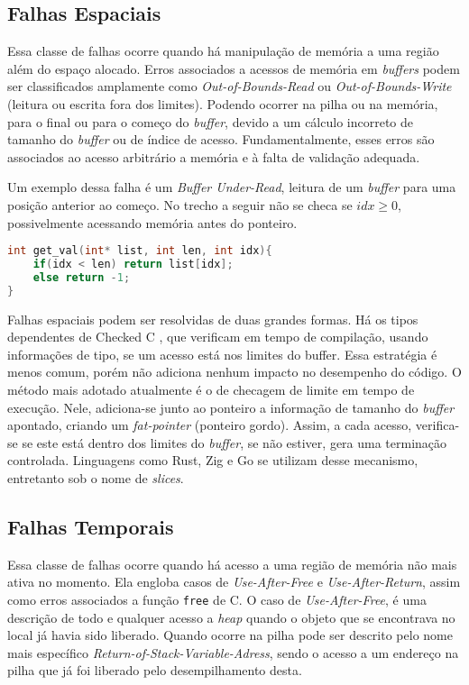 \subsection{Falhas Espaciais}
\label{sec:mem-error:spacial}

Essa classe de falhas ocorre quando há manipulação de memória a uma região além do espaço alocado. Erros associados a acessos de memória em \emph{buffers} podem ser classificados amplamente como \emph{Out-of-Bounds-Read} ou \emph{Out-of-Bounds-Write} (leitura ou escrita fora dos limites). Podendo ocorrer na pilha ou na memória, para o final ou para o começo do \emph{buffer}, devido a um cálculo incorreto de tamanho do \emph{buffer} ou de índice de acesso.  Fundamentalmente, esses erros são associados ao acesso arbitrário a memória e à falta de validação adequada.

Um exemplo dessa falha é um \emph{Buffer Under-Read}, 
leitura de um \emph{buffer} para uma posição anterior ao começo. No trecho a seguir
não se checa se $idx \ge 0$, possivelmente acessando memória antes do ponteiro.

\begin{lstlisting}[language=C ,label={lst:spacial-error-c}, caption=Exemplo de uma Falha Espacial]
int get_val(int* list, int len, int idx){
	if(idx < len) return list[idx];
 	else return -1;
}
\end{lstlisting}

Falhas espaciais podem ser resolvidas de duas grandes formas. Há os tipos dependentes de Checked C \cite{CHECKEDC}, que verificam em tempo de compilação, usando informações de tipo, se um acesso está nos limites do buffer. Essa estratégia é menos comum, porém não adiciona nenhum impacto no desempenho do código. 
O método mais adotado atualmente é o de checagem de limite em tempo de execução. Nele, adiciona-se junto ao ponteiro a informação de tamanho do \emph{buffer} apontado, criando um \emph{fat-pointer} (ponteiro gordo). Assim, a cada acesso, verifica-se se este está dentro dos limites do \emph{buffer}, se não estiver, gera uma terminação controlada. Linguagens como Rust, Zig e Go se utilizam desse mecanismo, entretanto sob o nome de \emph{slices}.


\subsection{Falhas Temporais}
\label{sec:mem-error:temporal}

Essa classe de falhas ocorre quando há acesso a uma região de memória não mais ativa no momento. Ela engloba casos de \emph{Use-After-Free} e \emph{Use-After-Return}, assim como erros associados a função \lstinline[language=C]|free| de C. O caso de \emph{Use-After-Free}, é uma descrição de todo e qualquer acesso a \emph{heap} quando o objeto que se encontrava no local já havia sido liberado. Quando ocorre na pilha pode ser descrito pelo nome mais específico \emph{Return-of-Stack-Variable-Adress}, sendo o acesso a um endereço na pilha que já foi liberado pelo desempilhamento desta.

